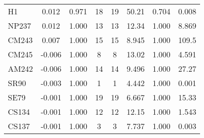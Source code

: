 \begin{tabular}{|l|ccccccc|}
H1 & 0.012 & 0.971 & 18 & 19 & 50.21 & 0.704 & 0.008\\
NP237 & 0.012 & 1.000 & 13 & 13 & 12.34 & 1.000 & 8.869\\
CM243 & 0.007 & 1.000 & 15 & 15 & 8.945 & 1.000 & 109.5\\
CM245 & -0.006 & 1.000 & 8 & 8 & 13.02 & 1.000 & 4.591\\
AM242 & -0.006 & 1.000 & 14 & 14 & 9.496 & 1.000 & 27.27\\
SR90 & -0.003 & 1.000 & 1 & 1 & 4.442 & 1.000 & 0.001\\
SE79 & -0.001 & 1.000 & 19 & 19 & 6.667 & 1.000 & 15.33\\
CS134 & -0.001 & 1.000 & 12 & 12 & 12.15 & 1.000 & 1.543\\
CS137 & -0.001 & 1.000 & 3 & 3 & 7.737 & 1.000 & 0.003\\
\hline
\end{tabular}